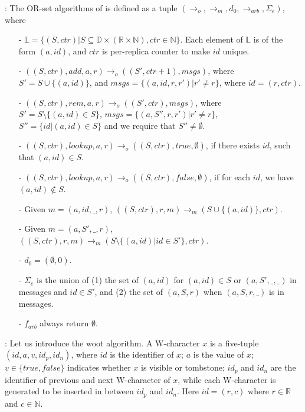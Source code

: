 : The OR-set algorithms of \cite{Shapiro:2011} is defined as a tuple $(\rightarrow_o,\rightarrow_m,d_0,\rightarrow_{\mathit{arb}}, \Sigma_e)$, where

\begin{itemize}
\setlength{\itemsep}{0.5pt}
\item[-] $\mathbb{L} = \{ (S,ctr) \vert S \subseteq \mathbb{D} \times (\mathbb{R} \times \mathbb{N}), ctr \in \mathbb{N} \}$. Each element of $\mathbb{L}$ is of the form $(a,id)$, and $ctr$ is per-replica counter to make $id$ unique.

\item[-] $((S,ctr),add,a,r) \rightarrow_o ((S',ctr+1),msgs)$, where $S'=S \cup \{ (a,id) \}$, and $msgs = \{ (a,id,r,r') \vert r' \neq r \}$, where $id = (r,ctr)$.

\item[-] $((S,ctr),rem,a,r) \rightarrow_o ((S',ctr),msgs)$, where $S'=S \setminus \{ (a,id) \in S \}$, $msgs = \{ (a,S'',r,r') \vert r' \neq r \} $, $S'' = \{ id \vert (a,id) \in S \}$ and we require that $S'' \neq \emptyset$.

\item[-] $((S,ctr),lookup,a,r) \rightarrow_o ((S,ctr),\mathit{true},\emptyset)$, if there exists $id$, such that $(a,id) \in S$.

\item[-] $((S,ctr),lookup,a,r) \rightarrow_o ((S,ctr),\mathit{false},\emptyset)$, if for each $id$, we have $(a,id) \notin S$.

\item[-] Given $m=(a,id,\_,r)$, $((S,ctr),r,m) \rightarrow_m (S \cup \{ (a,id) \},ctr)$.

\item[-] Given $m=(a,S',\_,r)$, $((S,ctr),r,m) \rightarrow_m (S \setminus \{ (a,id) \vert id \in S' \},ctr)$.

\item[-] $d_0 = (\emptyset,0)$.

\item[-] $\Sigma_e$ is the union of (1) the set of $(a,id)$ for $(a,id) \in S$ or $(a,S',\_,\_)$ in messages and $id \in S'$, and (2) the set of $(a,S,r)$ when $(a,S,r,\_)$ is in messages.

\item[-] $f_{arb}$ always return $\emptyset$.
\end{itemize}


: Let us introduce the woot algorithm. A W-character $x$ is a five-tuple $(id,a,v,id_p,id_n)$, where $id$ is the identifier of $x$; $a$ is the value of $x$; $v \in \{ \mathit{true},\mathit{false} \}$ indicates whether $x$ is visible or tombstone; $id_p$ and $id_n$ are the identifier of previous and next W-character of $x$, while each W-character is generated to be inserted in between $id_p$ and $id_n$. Here $id=(r,c)$ where $r \in \mathbb{R}$ and $c \in \mathbb{N}$.

